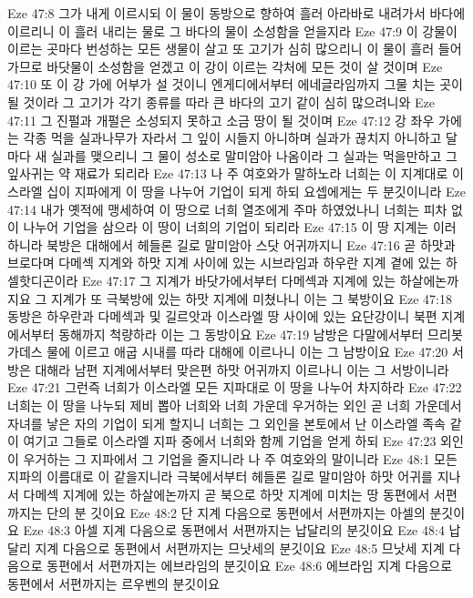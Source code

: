 Eze 47:8  그가 내게 이르시되 이 물이 동방으로 향하여 흘러 아라바로 내려가서 바다에 이르리니 이 흘러 내리는 물로 그 바다의 물이 소성함을 얻을지라
Eze 47:9  이 강물이 이르는 곳마다 번성하는 모든 생물이 살고 또 고기가 심히 많으리니 이 물이 흘러 들어 가므로 바닷물이 소성함을 얻겠고 이 강이 이르는 각처에 모든 것이 살 것이며
Eze 47:10  또 이 강 가에 어부가 설 것이니 엔게디에서부터 에네글라임까지 그물 치는 곳이 될 것이라 그 고기가 각기 종류를 따라 큰 바다의 고기 같이 심히 많으려니와
Eze 47:11  그 진펄과 개펄은 소성되지 못하고 소금 땅이 될 것이며
Eze 47:12  강 좌우 가에는 각종 먹을 실과나무가 자라서 그 잎이 시들지 아니하며 실과가 끊치지 아니하고 달마다 새 실과를 맺으리니 그 물이 성소로 말미암아 나옴이라 그 실과는 먹을만하고 그 잎사귀는 약 재료가 되리라
Eze 47:13  나 주 여호와가 말하노라 너희는 이 지계대로 이스라엘 십이 지파에게 이 땅을 나누어 기업이 되게 하되 요셉에게는 두 분깃이니라
Eze 47:14  내가 옛적에 맹세하여 이 땅으로 너희 열조에게 주마 하였었나니 너희는 피차 없이 나누어 기업을 삼으라 이 땅이 너희의 기업이 되리라
Eze 47:15  이 땅 지계는 이러하니라 북방은 대해에서 헤들론 길로 말미암아 스닷 어귀까지니
Eze 47:16  곧 하맛과 브로다며 다메섹 지계와 하맛 지계 사이에 있는 시브라임과 하우란 지계 곁에 있는 하셀핫디곤이라
Eze 47:17  그 지계가 바닷가에서부터 다메섹과 지계에 있는 하살에논까지요 그 지계가 또 극북방에 있는 하맛 지계에 미쳤나니 이는 그 북방이요
Eze 47:18  동방은 하우란과 다메섹과 및 길르앗과 이스라엘 땅 사이에 있는 요단강이니 북편 지계에서부터 동해까지 척량하라 이는 그 동방이요
Eze 47:19  남방은 다말에서부터 므리봇 가데스 물에 이르고 애굽 시내를 따라 대해에 이르나니 이는 그 남방이요
Eze 47:20  서방은 대해라 남편 지계에서부터 맞은편 하맛 어귀까지 이르나니 이는 그 서방이니라
Eze 47:21  그런즉 너희가 이스라엘 모든 지파대로 이 땅을 나누어 차지하라
Eze 47:22  너희는 이 땅을 나누되 제비 뽑아 너희와 너희 가운데 우거하는 외인 곧 너희 가운데서 자녀를 낳은 자의 기업이 되게 할지니 너희는 그 외인을 본토에서 난 이스라엘 족속 같이 여기고 그들로 이스라엘 지파 중에서 너희와 함께 기업을 얻게 하되
Eze 47:23  외인이 우거하는 그 지파에서 그 기업을 줄지니라 나 주 여호와의 말이니라
Eze 48:1  모든 지파의 이름대로 이 같을지니라 극북에서부터 헤들론 길로 말미암아 하맛 어귀를 지나서 다메섹 지계에 있는 하살에논까지 곧 북으로 하맛 지계에 미치는 땅 동편에서 서편까지는 단의 분 깃이요
Eze 48:2  단 지계 다음으로 동편에서 서편까지는 아셀의 분깃이요
Eze 48:3  아셀 지계 다음으로 동편에서 서편까지는 납달리의 분깃이요
Eze 48:4  납달리 지계 다음으로 동편에서 서편까지는 므낫세의 분깃이요
Eze 48:5  므낫세 지계 다음으로 동편에서 서편까지는 에브라임의 분깃이요
Eze 48:6  에브라임 지계 다음으로 동편에서 서편까지는 르우벤의 분깃이요
